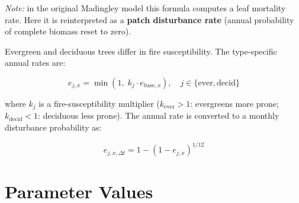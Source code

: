 \documentclass[12pt]{article}
\begin{document}
\noindent\textit{Note:} in the original Madingley model this formula computes a leaf
mortality rate. Here it is reinterpreted as a \textbf{patch disturbance rate} (annual
probability of complete biomass reset to zero).

Evergreen and deciduous trees differ in fire susceptibility. The type-specific annual
rates are:

\begin{equation}
    e_{j,x} = \min\!\left(1,\; k_j \cdot e_{\mathrm{base},x}\right),
    \quad j \in \{\mathrm{ever, decid}\}
    \label{eq:fire_type}
\end{equation}

where $k_j$ is a fire-susceptibility multiplier ($k_{\mathrm{ever}} > 1$: evergreens
more prone; $k_{\mathrm{decid}} < 1$: deciduous less prone). The annual rate is
converted to a monthly disturbance probability as:

\begin{equation}
    e_{j,x,\Delta t} = 1 - (1 - e_{j,x})^{1/12}
    \label{eq:fire_monthly}
\end{equation}

\section{Parameter Values}
\end{document}
